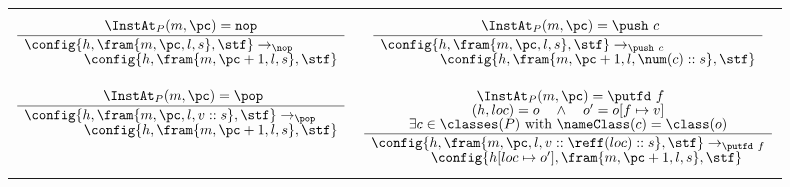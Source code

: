\begin{figure}[htbp]
  \begin{center}
\begin{tabular}[c]{cc}
\begin{minipage}[c]{6cm}  \footnotesize
$$\frac{%
{\renewcommand{\arraystretch}{0.7} \begin{array}[c]{c}
\ \InstAt_P(m,\pc)=\mathtt{nop}\ 
\end{array}}}%
{\begin{array}[t]{l}
\config{h,\fram{m,\pc,l,s},\stf} \to_{\nop}\\
\spp \config{h,\fram{m,\pc+1,l,s},\stf}
\end{array}}$$
\end{minipage}
&
\begin{minipage}[c]{6cm}  \footnotesize
$$\frac{%
{\renewcommand{\arraystretch}{0.7} \begin{array}[c]{c}
\ \InstAt_P(m,\pc)=\push\ c
\end{array}}}%
{\begin{array}[t]{l}
\config{h,\fram{m,\pc,l,s},\stf} \to_{\push\ c}\\
\spp \config{h,\fram{m,\pc+1,l,\num(c)::s},\stf}
\end{array}}$$
\end{minipage}

\\

\begin{minipage}[c]{6cm}  \footnotesize
$$\frac{%
{\renewcommand{\arraystretch}{0.7} \begin{array}[c]{c}
\ \InstAt_P(m,\pc)=\pop
\end{array}}}%
{\begin{array}[t]{l}
\config{h,\fram{m,\pc,l,v::s},\stf} \to_{\pop}\\
\spp \config{h,\fram{m,\pc+1,l,s},\stf}
\end{array}}$$
\end{minipage}
&
\begin{minipage}[c]{6cm}  \footnotesize
$$\frac{%
{\renewcommand{\arraystretch}{0.7} \begin{array}[c]{c}
\ \InstAt_P(m,\pc)=\putfd\ f\\
(h, loc)=o\quad \wedge\quad o'=o[f\mapsto v]\\
\exists c\in \classes(P)\text{ with } \nameClass(c)=\class(o)
\end{array}}}%
{\begin{array}[t]{l}
\config{h,\fram{m,\pc,l,v::\reff(loc)::s},\stf} \to_{\putfd\ f}\\
\spp \config{h[loc\mapsto o'],\fram{m,\pc+1,l,s},\stf}
\end{array}}$$
\end{minipage}


\end{tabular}
\end{center}
\end{figure}
